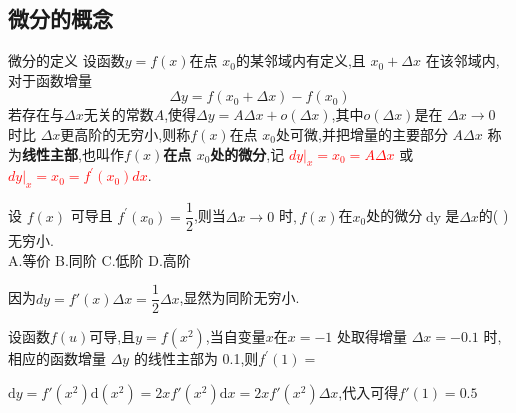 \documentclass[8pt a4paper, oneside, UTF8]{ctexbook}  %
\begin{document}
\begin{sloppypar}
    \subsection{微分的概念}
    \begin{defn}{微分的定义}{}
        设函数$y=f(x)$在点 $x_0$的某邻域内有定义,且 $x_0+\Delta x$ 在该邻域内,对于函数增量
        $$\Delta y= f( x_0+ \Delta x) - f( x_0)$$
        若存在与$\Delta x$无关的常数$A$,使得$\Delta y=A\Delta x+o(\Delta x)$,其中$o(\Delta x)$是在 $\Delta x \to 0$ 时比 $\Delta x$更高阶的无穷小,则称$f(x)$在点 $x_0$处可微,并把增量的主要部分 $A\Delta x$ 称为\textbf{线性主部},也叫作\textbf{$f(x)$在点 $x_0$处的微分},记 \textcolor{red}{$dy|_x=x_0=A\Delta x$} 或 \textcolor{red}{$dy|_x=x_0=f^{\prime}(x_0)dx$}.
    \end{defn}
    \begin{problem}
    设 $f(x)$ 可导且 $f^\prime(x_0)=\dfrac12$,则当$\Delta x\to0$ 时$,f(x)$在$x_0$处的微分$\operatorname{dy}$是$\Delta x$的( )无穷小.\\
    A.等价 \quad B.同阶 \quad C.低阶 \quad D.高阶
    \end{problem}
    \begin{solution}
        因为$dy=f'(x) \Delta x=\dfrac{1}{2}\Delta x$,显然为同阶无穷小.
    \end{solution}
    \begin{problem}
    设函数$f(u)$可导,且$y=f(x^2)$,当自变量$x$在$x=-1$ 处取得增量 $\Delta x=-0.1$ 时,相应的函数增量 $\Delta y$ 的线性主部为 0.1,则$f^\prime(1)=$
    \end{problem}
    \begin{solution}
        $\mathrm{d}y=f'(x^2)\mathrm{d}(x^2)=2xf'(x^2)\mathrm{d}x=2xf'(x^2)\Delta x$,代入可得$f'(1)=0.5$
    \end{solution}

\end{sloppypar}
\end{document}
